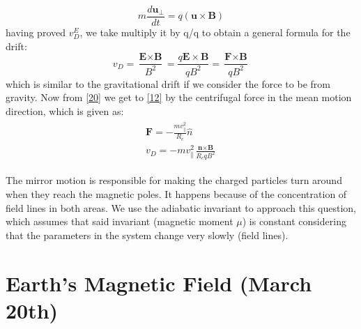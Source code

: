 \documentclass[12pt,a4paper]{article}
\begin{document}
\begin{equation}
    m\frac{d\textbf{u}_\bot}{dt}=q(\textbf{u}\times\textbf{B})
\end{equation}
having proved $v^E_D$, we take multiply it by q/q to obtain a general formula for the drift:
\begin{equation}
\label{20}
    v_D=\frac{\textbf{E}\times \textbf{B}}{B^2}=\frac{q\textbf{E}\times\textbf{B}}{qB^2}=\frac{\textbf{F}\times \textbf{B}}{qB^2}
\end{equation}
which is similar to the gravitational drift if we consider the force to be from gravity. Now from \eqref{20} we get to \eqref{12} by the centrifugal force in the mean motion direction, which is given as:
\begin{align}
\begin{split}
    \textbf{F}=-\frac{mv^2_\|}{R_c}\hat{n} \\
    v_D=-mv^2_\|\frac{\textbf{n}\times\textbf{B}}{R_cqB^2}
\end{split}
\end{align}

The mirror motion is responsible for making the charged particles turn around when they reach the magnetic poles. It happens because of the concentration of field lines in both areas. We use the adiabatic invariant to approach this question, which assumes that said invariant (magnetic moment $\mu$) is constant considering that the parameters in the system change very slowly (field lines). 
\vspace{10mm}

\section{Earth's Magnetic Field (March 20th)}
\end{document}
